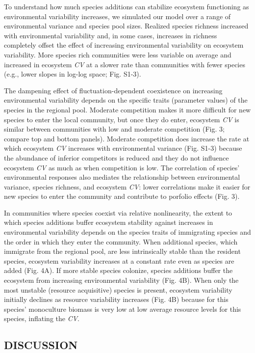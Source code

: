 \documentclass[12pt,]{article}
\begin{document}
To understand how much species additions can stabilize ecosystem
functioning as environmental variability increases, we simulated our
model over a range of environmental variance and species pool sizes.
Realized species richness increased with environmental variability and,
in some cases, increases in richness completely offset the effect of
increasing environmental variability on ecosystem variability. More
species rich communities were less variable on average and increased in
ecosystem \emph{CV} at a slower rate than communities with fewer species
(e.g., lower slopes in log-log space; Fig. S1-3).

The dampening effect of fluctuation-dependent coexistence on increasing
environmental variability depends on the specific traits (parameter
values) of the species in the regional pool. Moderate competition makes
it more difficult for new species to enter the local community, but once
they do enter, ecosystem \emph{CV} is similar between communities with
low and moderate competition (Fig. 3; compare top and bottom panels).
Moderate competition does increase the rate at which ecosystem \emph{CV}
increases with environmental variance (Fig. S1-3) because the abundance
of inferior competitors is reduced and they do not influence ecosystem
\emph{CV} as much as when competition is low. The correlation of
species' environmental responses also mediates the relationship between
environmental variance, species richness, and ecosystem \emph{CV}: lower
correlations make it easier for new species to enter the community and
contribute to porfolio effects (Fig. 3).

In communities where species coexist via relative nonlinearity, the
extent to which species additions buffer ecosystem stability against
increases in environmental variability depends on the species traits of
immigrating species and the order in which they enter the community.
When additional species, which immigrate from the regional pool, are
less intrinsically stable than the resident species, ecosystem
variability increases at a constant rate even as species are added (Fig.
4A). If more stable species colonize, species additions buffer the
ecosystem from increasing environmental variability (Fig. 4B). When only
the most unstable (resource acquisitive) species is present, ecosystem
variability initially declines as resource variability increases (Fig.
4B) because for this species' monoculture biomass is very low at low
average resource levels for this species, inflating the \emph{CV}.

\subsection{DISCUSSION}\label{discussion}
\end{document}
